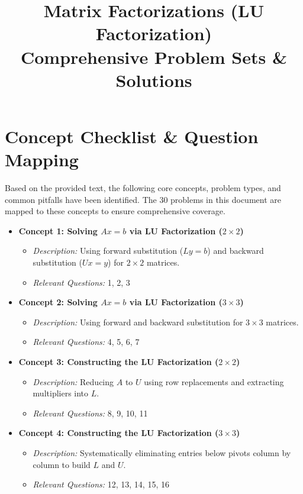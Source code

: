 \documentclass[11pt]{article}
\title{Matrix Factorizations (LU Factorization) \\ \Large Comprehensive Problem Sets \& Solutions}
\author{}
\date{}
\begin{document}
\maketitle
\tableofcontents
\newpage

\section{Concept Checklist \& Question Mapping}
Based on the provided text, the following core concepts, problem types, and common pitfalls have been identified. The 30 problems in this document are mapped to these concepts to ensure comprehensive coverage.

\begin{itemize}
    \item \textbf{Concept 1: Solving $Ax = b$ via LU Factorization ($2 \times 2$)} 
    \begin{itemize}
        \item \textit{Description:} Using forward substitution ($Ly = b$) and backward substitution ($Ux = y$) for $2 \times 2$ matrices.
        \item \textit{Relevant Questions:} 1, 2, 3
    \end{itemize}
    
    \item \textbf{Concept 2: Solving $Ax = b$ via LU Factorization ($3 \times 3$)} 
    \begin{itemize}
        \item \textit{Description:} Using forward and backward substitution for $3 \times 3$ matrices.
        \item \textit{Relevant Questions:} 4, 5, 6, 7
    \end{itemize}
    
    \item \textbf{Concept 3: Constructing the LU Factorization ($2 \times 2$)} 
    \begin{itemize}
        \item \textit{Description:} Reducing $A$ to $U$ using row replacements and extracting multipliers into $L$.
        \item \textit{Relevant Questions:} 8, 9, 10, 11
    \end{itemize}
    
    \item \textbf{Concept 4: Constructing the LU Factorization ($3 \times 3$)} 
    \begin{itemize}
        \item \textit{Description:} Systematically eliminating entries below pivots column by column to build $L$ and $U$.
        \item \textit{Relevant Questions:} 12, 13, 14, 15, 16
    \end{itemize}
    

\end{itemize}
\end{document}
